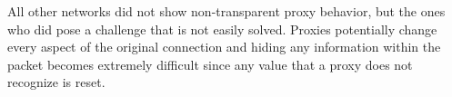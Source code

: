\documentclass{sig-alternate-10pt}
\begin{document}
All other networks did not show non-transparent proxy behavior, but the ones who did pose a challenge that is not easily solved. Proxies potentially change every aspect of the original connection and hiding any information within the packet becomes extremely difficult since any value that a proxy does not recognize is reset.


\end{document}
